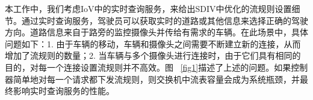 \documentclass{ctexart}
\begin{document}
本工作中，我们考虑IoV中的实时查询服务，来给出SDIV中优化的流规则设置细节。通过实时查询服务，驾驶员可以获取实时的道路或其他信息来选择正确的驾驶方向。道路信息来自于路旁的监控摄像头并传给有需求的车辆。在此场景中，具体问题如下：1. 由于车辆的移动，车辆和摄像头之间需要不断建立新的连接，从而增加了流规则的数量；2. 当车辆与多个摄像头进行连接时，由于它们具有相同的目的，对每一个连接设置流规则并不高效。图~ \ref{fig1}描述了上述的问题。如果控制器简单地对每一个请求都下发流规则，则交换机中流表容量会成为系统瓶颈，并最终影响实时查询服务的性能。

\end{document}
